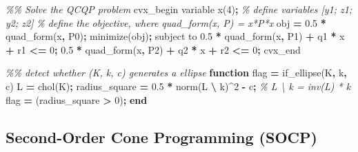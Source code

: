 \documentclass[
]{book}
\newenvironment{Shaded}{\begin{snugshade}}{\end{snugshade}}
\newcommand{\CommentTok}[1]{\textcolor[rgb]{0.56,0.35,0.01}{\textit{#1}}}
\newcommand{\FloatTok}[1]{\textcolor[rgb]{0.00,0.00,0.81}{#1}}
\newcommand{\KeywordTok}[1]{\textcolor[rgb]{0.13,0.29,0.53}{\textbf{#1}}}
\newcommand{\NormalTok}[1]{#1}
\newcommand{\OperatorTok}[1]{\textcolor[rgb]{0.81,0.36,0.00}{\textbf{#1}}}
\newcommand{\VariableTok}[1]{\textcolor[rgb]{0.00,0.00,0.00}{#1}}
\theoremstyle{definition}
\theoremstyle{definition}
\theoremstyle{definition}
\theoremstyle{definition}
\theoremstyle{remark}
\begin{document}
\begin{Shaded}
\begin{Highlighting}[]
\CommentTok{\%\% Solve the QCQP problem}
\VariableTok{cvx\_begin}
    \VariableTok{variable} \VariableTok{x}\NormalTok{(}\FloatTok{4}\NormalTok{)}\OperatorTok{;} \CommentTok{\% define variables [y1; z1; y2; z2]}
    \CommentTok{\% define the objective, where quad\_form(x, P) = x\textquotesingle{}*P*x}
    \VariableTok{obj} \OperatorTok{=} \FloatTok{0.5} \OperatorTok{*} \VariableTok{quad\_form}\NormalTok{(}\VariableTok{x}\OperatorTok{,} \VariableTok{P0}\NormalTok{)}\OperatorTok{;} 
    \VariableTok{minimize}\NormalTok{(}\VariableTok{obj}\NormalTok{)}\OperatorTok{;} 
    \VariableTok{subject} \VariableTok{to}
        \FloatTok{0.5} \OperatorTok{*} \VariableTok{quad\_form}\NormalTok{(}\VariableTok{x}\OperatorTok{,} \VariableTok{P1}\NormalTok{) }\OperatorTok{+} \VariableTok{q1}\OperatorTok{\textquotesingle{}} \OperatorTok{*} \VariableTok{x} \OperatorTok{+} \VariableTok{r1} \OperatorTok{\textless{}=} \FloatTok{0}\OperatorTok{;}
        \FloatTok{0.5} \OperatorTok{*} \VariableTok{quad\_form}\NormalTok{(}\VariableTok{x}\OperatorTok{,} \VariableTok{P2}\NormalTok{) }\OperatorTok{+} \VariableTok{q2}\OperatorTok{\textquotesingle{}} \OperatorTok{*} \VariableTok{x} \OperatorTok{+} \VariableTok{r2} \OperatorTok{\textless{}=} \FloatTok{0}\OperatorTok{;}
\VariableTok{cvx\_end}

\CommentTok{\%\% detect whether (K, k, c) generates a ellipse}
\KeywordTok{function} \VariableTok{flag} \OperatorTok{=} \VariableTok{if\_ellipse}\NormalTok{(}\VariableTok{K}\OperatorTok{,} \VariableTok{k}\OperatorTok{,} \VariableTok{c}\NormalTok{)}
    \VariableTok{L} \OperatorTok{=} \VariableTok{chol}\NormalTok{(}\VariableTok{K}\NormalTok{)}\OperatorTok{;}
    \VariableTok{radius\_square} \OperatorTok{=} \FloatTok{0.5} \OperatorTok{*} \VariableTok{norm}\NormalTok{(}\VariableTok{L} \OperatorTok{\textbackslash{}} \VariableTok{k}\NormalTok{)}\OperatorTok{\^{}}\FloatTok{2} \OperatorTok{{-}} \VariableTok{c}\OperatorTok{;} \CommentTok{\% L \textbackslash{} k = inv(L) * k}
    \VariableTok{flag} \OperatorTok{=}\NormalTok{ (}\VariableTok{radius\_square} \OperatorTok{\textgreater{}} \FloatTok{0}\NormalTok{)}\OperatorTok{;}
\KeywordTok{end}
\end{Highlighting}
\end{Shaded}

\hypertarget{second-order-cone-programming-socp}{%
\subsection{Second-Order Cone Programming (SOCP)}\label{second-order-cone-programming-socp}}
\end{document}
